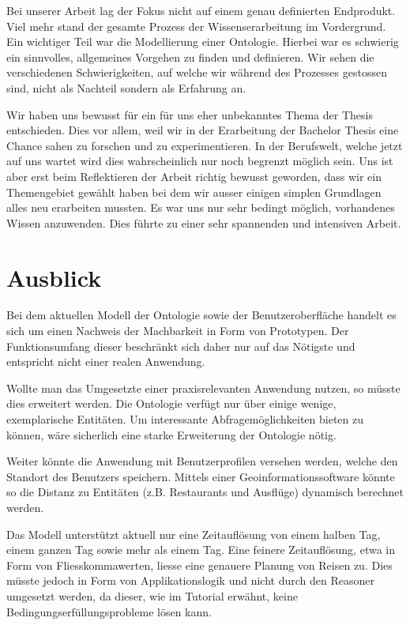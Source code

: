 Bei unserer Arbeit lag der Fokus nicht auf einem genau definierten Endprodukt. Viel mehr stand der gesamte Prozess der Wissenserarbeitung im Vordergrund. Ein wichtiger Teil war die Modellierung einer Ontologie. Hierbei war es schwierig ein sinnvolles, allgemeines Vorgehen zu finden und definieren. Wir sehen die verschiedenen Schwierigkeiten, auf welche wir während des Prozesses gestossen sind, nicht als Nachteil sondern als Erfahrung an.

Wir haben uns bewusst für ein für uns eher unbekanntes Thema der Thesis entschieden. Dies vor allem, weil wir in der Erarbeitung der Bachelor Thesis eine Chance sahen zu forschen und zu experimentieren. In der Berufswelt, welche jetzt auf uns wartet wird dies wahrscheinlich nur noch begrenzt möglich sein. Uns ist aber erst beim Reflektieren der Arbeit richtig bewusst geworden, dass wir ein Themengebiet gewählt haben bei dem wir ausser einigen simplen Grundlagen alles neu erarbeiten mussten. Es war uns nur sehr bedingt möglich, vorhandenes Wissen anzuwenden. Dies führte zu einer sehr spannenden und intensiven Arbeit.


\section{Ausblick}
\label{sec:fazit_subchap}
Bei dem aktuellen Modell der Ontologie sowie der Benutzeroberfläche handelt es sich um einen Nachweis der Machbarkeit in Form von Prototypen. Der Funktionsumfang dieser beschränkt sich daher nur auf das Nötigste und entspricht nicht einer realen Anwendung.

Wollte man das Umgesetzte einer praxisrelevanten Anwendung nutzen, so müsste dies erweitert werden. Die Ontologie verfügt nur über einige wenige, exemplarische Entitäten. Um interessante Abfragemöglichkeiten bieten zu können, wäre sicherlich eine starke Erweiterung der Ontologie nötig.

Weiter könnte die Anwendung mit Benutzerprofilen versehen werden, welche den Standort des Benutzers speichern. Mittels einer Geoinformationssoftware könnte so die Distanz zu Entitäten (z.B. Restaurants und Ausflüge) dynamisch berechnet werden.

Das Modell unterstützt aktuell nur eine Zeitauflösung von einem halben Tag, einem ganzen Tag sowie mehr als einem Tag. Eine feinere Zeitauflösung, etwa in Form von Fliesskommawerten, liesse eine genauere Planung von Reisen zu. Dies müsste jedoch in Form von Applikationslogik und nicht durch den Reasoner umgesetzt werden, da dieser, wie im Tutorial erwähnt, keine Bedingungserfüllungsprobleme lösen kann.


